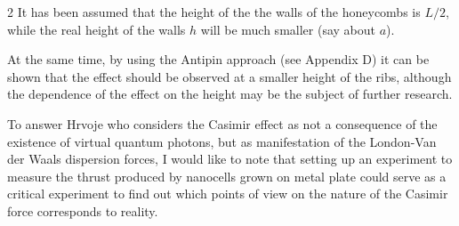 \documentclass[twoside, 10pt]{article}
\def\myvspacebeforesubsection{-2.0mm}
\def\myvspaceaftersubsection{-2.5mm}
\begin{document}
\begin{multicols}{2}
    It has been assumed that the height of the the walls of the honeycombs is \(L/2\),
while the real height of the walls \(h\) will be much smaller (say about \(a\)).

    At the same time, by using the Antipin approach (see Appendix D) it can be
shown that the effect should be observed at a smaller height of the
ribs, although the dependence of the effect on the height may be the
subject of further research.

    To answer Hrvoje \cite{Hrvoje2016} who considers the Casimir
effect as not a consequence of the existence of virtual quantum photons,
but as manifestation of the London-Van der Waals dispersion
forces, I would like to note that setting up an experiment to measure the thrust
produced by nanocells grown on metal plate could serve as a critical
experiment to find out which points of view on the nature of the
Casimir force corresponds to reality.

\end{multicols}

\vspace{\myvspacebeforesubsection}
    \subsection*{}\label{appendix-a.-integration-details}
\vspace{\myvspaceaftersubsection}
\end{document}
